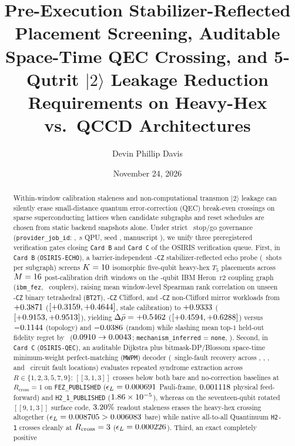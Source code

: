 \documentclass[aps,prx,twocolumn,superscriptaddress,nofootinbib]{revtex4-2}
\begin{document}
\title{Pre-Execution Stabilizer-Reflected Placement Screening, Auditable Space-Time QEC Crossing, and 5-Qutrit $|2\rangle$ Leakage Reduction Requirements on Heavy-Hex vs.\ QCCD Architectures}

\author{Devin Phillip Davis}
\date{November 24, 2026}

\begin{abstract}
Within-window calibration staleness and non-computational transmon $|2\rangle$ leakage can silently erase small-distance quantum error-correction (QEC) break-even crossings on sparse superconducting lattices when candidate subgraphs and reset schedules are chosen from static backend snapshots alone. Under strict \ecqExecTier\ stop/go governance (\texttt{provider\_job\_id}: \ecqJobId, \ecqQpuSec\,s QPU, seed \ecqSeed, manuscript \ecqPaperId), we unify three preregistered verification gates closing \texttt{Card B} and \texttt{Card C} of the OSIRIS verification queue. First, in \texttt{Card B} (\texttt{OSIRIS-ECHO}), a barrier-independent \ecqEchoNoBarrierOptThreeCz-\texttt{CZ} stabilizer-reflected echo probe (\ecqEchoShotsPerSubgraph\ shots per subgraph) screens $K = 10$ isomorphic five-qubit heavy-hex $T_5$ placements across $M = 16$ post-calibration drift windows on the \ecqHeronQubits-qubit IBM Heron~r2 coupling graph (\texttt{ibm\_fez}, \ecqHeronEdges\ couplers), raising mean window-level Spearman rank correlation on unseen \ecqBtWorkloadCz-\texttt{CZ} binary tetrahedral (\texttt{BT2T}), \ecqCliffWorkloadCz-\texttt{CZ} Clifford, and \ecqMirrorWorkloadCz-\texttt{CZ} non-Clifford mirror workloads from $+0.3871$ ($[+0.3159, +0.4644]$, stale calibration) to $+0.9333$ ($[+0.9153, +0.9513]$), yielding $\Delta\bar{\rho} = +0.5462$ ($[+0.4594, +0.6288]$) versus $-0.1144$ (topology) and $-0.0386$ (random) while slashing mean top-$1$ held-out fidelity regret by \ecqRegretRatioX\ ($0.0910 \to 0.0043$; \texttt{mechanism\_inferred} = \texttt{none}, \ecqCardBVerdict). Second, in \texttt{Card C} (\texttt{OSIRIS-QEC}), an auditable Dijkstra plus bitmask-DP/Blossom space-time minimum-weight perfect-matching (\texttt{MWPM}) decoder (\ecqSingleFaultRecoveryPct\ single-fault recovery across \ecqSingleFaultLocRepZ, \ecqSingleFaultLocRepX, \ecqSingleFaultLocSurfZ, and \ecqSingleFaultLocSurfX\ circuit fault locations) evaluates repeated syndrome extraction across $R \in \{1,2,3,5,7,9\}$: $[[3,1,3]]$ crosses below both bare and no-correction baselines at $R_{\mathrm{cross}} = 1$ on \texttt{FEZ\_PUBLISHED} ($\epsilon_L = 0.000691$ Pauli-frame, $0.001118$ physical feed-forward) and \texttt{H2\_1\_PUBLISHED} ($1.86 \times 10^{-5}$), whereas on the seventeen-qubit rotated $[[9,1,3]]$ surface code, $3.20\%$ readout staleness erases the heavy-hex crossing altogether ($\epsilon_L = 0.008705 > 0.006083$ bare) while native all-to-all Quantinuum \texttt{H2-1} crosses cleanly at $R_{\mathrm{cross}} = 3$ ($\epsilon_L = 0.000226$). Third, an exact completely positive 
\end{abstract}
\end{document}
